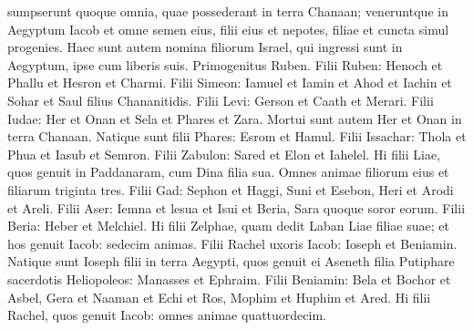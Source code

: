 \begin{biblechapter}
\begin{biblechapter}
\begin{biblechapter}
\begin{biblechapter}
\begin{biblechapter}
\begin{biblechapter}
\begin{biblechapter}
\begin{biblechapter}
\begin{biblechapter}
\begin{biblechapter}
\begin{biblechapter}
\begin{biblechapter}
\begin{biblechapter}
\begin{biblechapter}
\begin{biblechapter}
\begin{biblechapter}
\begin{biblechapter}
\begin{biblechapter}
\begin{biblechapter}
\begin{biblechapter}
\begin{biblechapter}
\begin{biblechapter}
\begin{biblechapter}
\begin{biblechapter}
\begin{biblechapter}
\begin{biblechapter}
\begin{biblechapter}
\begin{biblechapter}
\begin{biblechapter}
\begin{biblechapter}
\begin{biblechapter}
\begin{biblechapter}
\begin{biblechapter}
\begin{biblechapter}
\begin{biblechapter}
\begin{biblechapter}
\begin{biblechapter}
\begin{biblechapter}
\begin{biblechapter}
\begin{biblechapter}
\begin{biblechapter}
\begin{biblechapter}
\begin{biblechapter}
\begin{biblechapter}
\begin{biblechapter}
\begin{biblechapter}
\verse sumpserunt quoque omnia, quae possederant in terra Chanaan; veneruntque in Aegyptum Iacob et omne semen eius, 
\verse filii eius et nepotes, filiae et cuncta simul progenies.
 \verse Haec sunt autem nomina filiorum Israel, qui ingressi sunt in Aegyptum, ipse cum liberis suis.
 Primogenitus Ruben. 
\verse Filii Ruben: Henoch et Phallu et Hesron et Charmi.
 \verse Filii Simeon: Iamuel et Iamin et Ahod et Iachin et Sohar et Saul filius Chananitidis.
 \verse Filii Levi: Gerson et Caath et Merari.
 \verse Filii Iudae: Her et Onan et Sela et Phares et Zara. Mortui sunt autem Her et Onan in terra Chanaan. Natique sunt filii Phares: Esrom et Hamul.
 \verse Filii Issachar: Thola et Phua et Iasub et Semron.
 \verse Filii Zabulon: Sared et Elon et Iahelel.
 \verse Hi filii Liae, quos genuit in Paddanaram, cum Dina filia sua. Omnes animae filiorum eius et filiarum triginta tres.
 \verse Filii Gad: Sephon et Haggi, Suni et Esebon, Heri et Arodi et Areli.
 \verse Filii Aser: Iemna et lesua et Isui et Beria, Sara quoque soror eorum. Filii Beria: Heber et Melchiel.
 \verse Hi filii Zelphae, quam dedit Laban Liae filiae suae; et hos genuit Iacob: sedecim animas.
 \verse Filii Rachel uxoris Iacob: Ioseph et Beniamin. 
\verse Natique sunt Ioseph filii in terra Aegypti, quos genuit ei Aseneth filia Putiphare sacerdotis Heliopoleos: Manasses et Ephraim.
 \verse Filii Beniamin: Bela et Bochor et Asbel, Gera et Naaman et Echi et Ros, Mophim et Huphim et Ared.
 \verse Hi filii Rachel, quos genuit Iacob: omnes animae quattuordecim.

\end{biblechapter}
\end{biblechapter}
\end{biblechapter}
\end{biblechapter}
\end{biblechapter}
\end{biblechapter}
\end{biblechapter}
\end{biblechapter}
\end{biblechapter}
\end{biblechapter}
\end{biblechapter}
\end{biblechapter}
\end{biblechapter}
\end{biblechapter}
\end{biblechapter}
\end{biblechapter}
\end{biblechapter}
\end{biblechapter}
\end{biblechapter}
\end{biblechapter}
\end{biblechapter}
\end{biblechapter}
\end{biblechapter}
\end{biblechapter}
\end{biblechapter}
\end{biblechapter}
\end{biblechapter}
\end{biblechapter}
\end{biblechapter}
\end{biblechapter}
\end{biblechapter}
\end{biblechapter}
\end{biblechapter}
\end{biblechapter}
\end{biblechapter}
\end{biblechapter}
\end{biblechapter}
\end{biblechapter}
\end{biblechapter}
\end{biblechapter}
\end{biblechapter}
\end{biblechapter}
\end{biblechapter}
\end{biblechapter}
\end{biblechapter}
\end{biblechapter}
